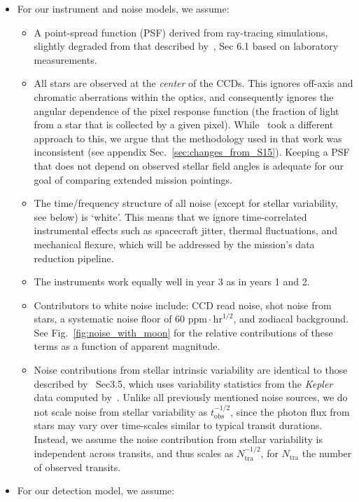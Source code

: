 \begin{itemize}
	\item For our instrument and noise models, we assume:
	\begin{itemize}
		\item A point-spread function (PSF) derived from ray-tracing simulations, slightly degraded from that described by~, Sec 6.1 based on laboratory measurements.
		\item All stars are observed at the \textit{center} of the \tess CCDs. This ignores off-axis and chromatic aberrations within the \tess optics, and consequently ignores the angular dependence of the pixel response function (the fraction of light from a star that is collected by a given pixel). 
		While~ took a different approach to this, we argue that the methodology used in that work was inconsistent (see appendix Sec.~\ref{sec:changes_from_S15}). Keeping a PSF that does not depend on observed stellar field angles is adequate for our goal of comparing extended mission pointings.
		\item The time/frequency structure of all noise (except for stellar variability, see below) is `white'. 
		This means that we ignore time-correlated instrumental effects such as spacecraft jitter, thermal fluctuations, and mechanical flexure, which will be addressed by the mission's data reduction pipeline.
		\item The instruments work equally well in year 3 as in years 1 and 2.
		\item Contributors to white noise include: CCD read noise, shot noise from stars, a systematic noise floor of 60 $\mathrm{ppm}\cdot\mathrm{hr}^{1/2}$, and zodiacal background. See Fig.~\ref{fig:noise_with_moon} for the relative contributions of these terms as a function of apparent magnitude.
		\item Noise contributions from stellar intrinsic variability are identical to those described by~ Sec3.5, which uses variability statistics from the \textit{Kepler} data computed by~\citet{basri_comparison_2013}. 
		Unlike all previously mentioned noise sources, we do not scale noise from stellar variability as $t_\mathrm{obs}^{-1/2}$, since the photon flux from stars may vary over time-scales similar to typical transit durations.
		Instead, we assume the noise contribution from stellar variability is independent across transits, and thus scales as $N_\mathrm{tra}^{-1/2}$, for $N_\mathrm{tra}$ the number of observed transits.
	\end{itemize}
	\item For our detection model, we assume:

\end{itemize}
